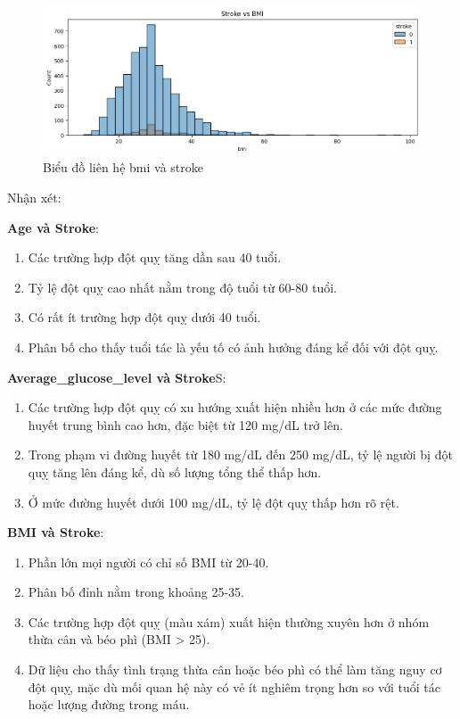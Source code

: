 \documentclass[11pt]{article}
\begin{document}
	 \begin{figure}[H]
	 	\centering
	 	\includegraphics[width=1.0\linewidth]{bmiAndStroke}
	 	\caption{Biểu đồ liên hệ bmi và stroke}
	 	\label{fig:bmiandstroke}
	 \end{figure}
	 
	 Nhận xét:
	 \vspace{0.2cm}
	 
	 \textbf{Age và Stroke}:
	 	\begin{enumerate}
	 		\item Các trường hợp đột quỵ tăng dần sau 40 tuổi.
	 		\item Tỷ lệ đột quỵ cao nhất nằm trong độ tuổi từ 60-80 tuổi.
	 		\item Có rất ít trường hợp đột quỵ dưới 40 tuổi.
	 		\item Phân bố cho thấy tuổi tác là yếu tố có ảnh hưởng đáng kể đối với đột quỵ.
	 	\end{enumerate}
	 	
	 \textbf{Average\_glucose\_level và Stroke}S:
	 	\begin{enumerate}
	 		\item Các trường hợp đột quỵ có xu hướng xuất hiện nhiều hơn ở các mức đường huyết trung bình cao hơn, đặc biệt từ 120 mg/dL trở lên.
	 		\item Trong phạm vi đường huyết từ 180 mg/dL đến 250 mg/dL, tỷ lệ người bị đột quỵ tăng lên đáng kể, dù số lượng tổng thể thấp hơn.
	 		\item Ở mức đường huyết dưới 100 mg/dL, tỷ lệ đột quỵ thấp hơn rõ rệt.
	 	\end{enumerate}
	 
	 \textbf{BMI và Stroke}:
	 	\begin{enumerate}
	 		\item Phần lớn mọi người có chỉ số BMI từ 20-40.
	 		\item Phân bố đỉnh nằm trong khoảng 25-35.
	 		\item Các trường hợp đột quỵ (màu xám) xuất hiện thường xuyên hơn ở nhóm thừa cân và béo phì (BMI > 25).
	 		\item Dữ liệu cho thấy tình trạng thừa cân hoặc béo phì có thể làm tăng nguy cơ đột quỵ, mặc dù mối quan hệ này có vẻ ít nghiêm trọng hơn so với tuổi tác hoặc lượng đường trong máu.
		\end{enumerate}
\end{document}
